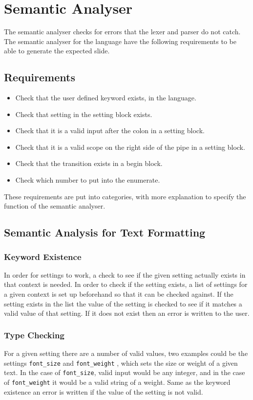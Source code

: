 \chapter{Semantic Analyser}

The semantic analyser checks for errors that the lexer and parser do not catch. The semantic analyser for the language have the following requirements to be able to generate the expected slide.

\section{Requirements}
\begin{itemize}
	\item Check that the user defined keyword exists, in the language.
	\item Check that setting in the setting block exists.
	\item Check that it is a valid input after the colon in a setting block.
	\item Check that it is a valid scope on the right side of the pipe in a setting block.
	\item Check that the transition exists in a begin block.
	\item Check which number to put into the enumerate.
\end{itemize}

These requirements are put into categories, with more explanation to specify the function of the semantic analyser.

\section{Semantic Analysis for Text Formatting}

    \subsection{Keyword Existence}
In order for settings to work, a check to see if the given setting actually exists in that context is needed. In order to check if the setting exists, a list of settings for a given context is set up beforehand so that it can be checked against. If the setting exists in the list the value of the setting is checked to see if it matches a valid value of that setting. If it does not exist then an error is written to the user.

    \subsection{Type Checking}
For a given setting there are a number of valid values, two examples could be the settings \texttt{font\_size} and \texttt{font\_weight} , which sets the size or weight of a given text. In the case of \texttt{font\_size}, valid input would be any integer, and in the case of \texttt{font\_weight} it would be a valid string of a weight. Same as the keyword existence an error is written if the value of the setting is not valid.

